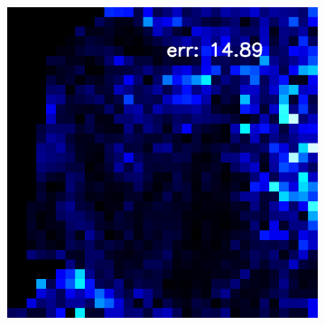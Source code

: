 \begin{figure}
\begin{subfigure}[b]{0.19\linewidth}
	\end{subfigure}
	\begin{subfigure}[b]{0.19\linewidth}
		\includegraphics[width=\linewidth]{./Figures/gcnn_synthetic/eval_3_error_an2-8-1000.png}
	\end{subfigure}
	

\end{figure}
